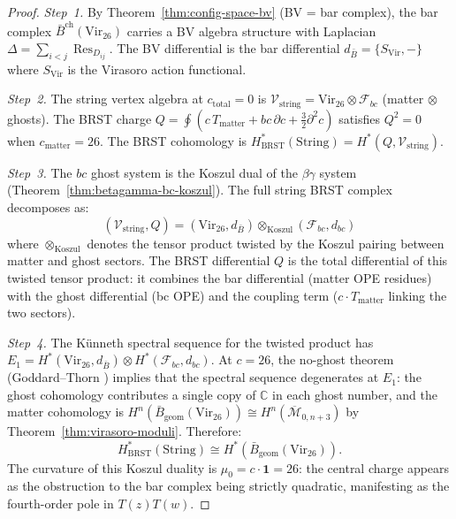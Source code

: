 \begin{proof}
\emph{Step~1.}
By Theorem~\ref{thm:config-space-bv} (BV = bar complex), the bar complex $\bar{B}^{\mathrm{ch}}(\mathrm{Vir}_{26})$ carries a BV algebra structure with Laplacian $\Delta = \sum_{i<j} \operatorname{Res}_{D_{ij}}$.  The BV differential is the bar differential $d_{\bar{B}} = \{S_{\mathrm{Vir}}, -\}$ where $S_{\mathrm{Vir}}$ is the Virasoro action functional.

\emph{Step~2.}
The string vertex algebra at $c_{\mathrm{total}} = 0$ is $\mathcal{V}_{\mathrm{string}} = \mathrm{Vir}_{26} \otimes \mathcal{F}_{bc}$ (matter $\otimes$ ghosts).  The BRST charge $Q = \oint(c\, T_{\mathrm{matter}} + bc\,\partial c + \tfrac{3}{2}\partial^2 c)$ satisfies $Q^2 = 0$ when $c_{\mathrm{matter}} = 26$.  The BRST cohomology is $H^*_{\mathrm{BRST}}(\mathrm{String}) = H^*(Q, \mathcal{V}_{\mathrm{string}})$.

\emph{Step~3.}
The $bc$ ghost system is the Koszul dual of the $\beta\gamma$ system (Theorem~\ref{thm:betagamma-bc-koszul}).  The full string BRST complex decomposes as:
\[
(\mathcal{V}_{\mathrm{string}}, Q) = (\mathrm{Vir}_{26}, d_{\bar{B}}) \otimes_{\mathrm{Koszul}} (\mathcal{F}_{bc}, d_{bc})
\]
where $\otimes_{\mathrm{Koszul}}$ denotes the tensor product twisted by the Koszul pairing between matter and ghost sectors.  The BRST differential $Q$ is the total differential of this twisted tensor product: it combines the bar differential (matter OPE residues) with the ghost differential (bc OPE) and the coupling term ($c \cdot T_{\mathrm{matter}}$ linking the two sectors).

\emph{Step~4.}
The Künneth spectral sequence for the twisted product has $E_1 = H^*(\mathrm{Vir}_{26}, d_{\bar{B}}) \otimes H^*(\mathcal{F}_{bc}, d_{bc})$.  At $c = 26$, the no-ghost theorem (Goddard--Thorn \cite{GT72}) implies that the spectral sequence degenerates at $E_1$: the ghost cohomology contributes a single copy of $\mathbb{C}$ in each ghost number, and the matter cohomology is $H^n(\bar{B}_{\mathrm{geom}}(\mathrm{Vir}_{26})) \cong H^n(\overline{\mathcal{M}}_{0,n+3})$ by Theorem~\ref{thm:virasoro-moduli}.  Therefore:
\[
H^*_{\mathrm{BRST}}(\mathrm{String}) \cong H^*(\bar{B}_{\mathrm{geom}}(\mathrm{Vir}_{26})).
\]
The curvature of this Koszul duality is $\mu_0 = c \cdot \mathbf{1} = 26$: the central charge appears as the obstruction to the bar complex being strictly quadratic, manifesting as the fourth-order pole in $T(z)T(w)$.
\end{proof}
 

